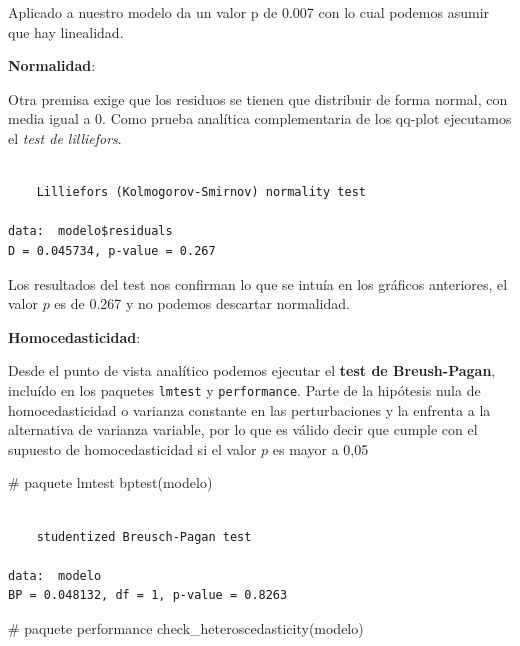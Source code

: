 \documentclass[
  letterpaper,
  DIV=11,
  numbers=noendperiod]{scrartcl}
\newenvironment{Shaded}{\begin{snugshade}}{\end{snugshade}}
\newcommand{\CommentTok}[1]{\textcolor[rgb]{0.37,0.37,0.37}{#1}}
\newcommand{\FunctionTok}[1]{\textcolor[rgb]{0.28,0.35,0.67}{#1}}
\newcommand{\NormalTok}[1]{\textcolor[rgb]{0.00,0.23,0.31}{#1}}
\newcommand{\SpecialCharTok}[1]{\textcolor[rgb]{0.37,0.37,0.37}{#1}}
\begin{document}
Aplicado a nuestro modelo da un valor p de 0.007 con lo cual podemos
asumir que hay linealidad.

\textbf{Normalidad}:

Otra premisa exige que los residuos se tienen que distribuir de forma
normal, con media igual a 0. Como prueba analítica complementaria de los
qq-plot ejecutamos el \emph{test de lilliefors}.

\begin{Shaded}
\end{Shaded}

\begin{verbatim}

    Lilliefors (Kolmogorov-Smirnov) normality test

data:  modelo$residuals
D = 0.045734, p-value = 0.267
\end{verbatim}

Los resultados del test nos confirman lo que se intuía en los gráficos
anteriores, el valor \(p\) es de 0.267 y no podemos descartar
normalidad.

\textbf{Homocedasticidad}:

Desde el punto de vista analítico podemos ejecutar el \textbf{test de
Breush-Pagan}, incluído en los paquetes \texttt{lmtest} y
\texttt{performance}. Parte de la hipótesis nula de homocedasticidad o
varianza constante en las perturbaciones y la enfrenta a la alternativa
de varianza variable, por lo que es válido decir que cumple con el
supuesto de homocedasticidad si el valor \(p\) es mayor a 0,05

\begin{Shaded}
\begin{Highlighting}[]
\CommentTok{\# paquete lmtest}
\FunctionTok{bptest}\NormalTok{(modelo)}
\end{Highlighting}
\end{Shaded}

\begin{verbatim}

    studentized Breusch-Pagan test

data:  modelo
BP = 0.048132, df = 1, p-value = 0.8263
\end{verbatim}

\begin{Shaded}
\begin{Highlighting}[]
\CommentTok{\# paquete performance}
\FunctionTok{check\_heteroscedasticity}\NormalTok{(modelo)}
\end{Highlighting}
\end{Shaded}
\end{document}
